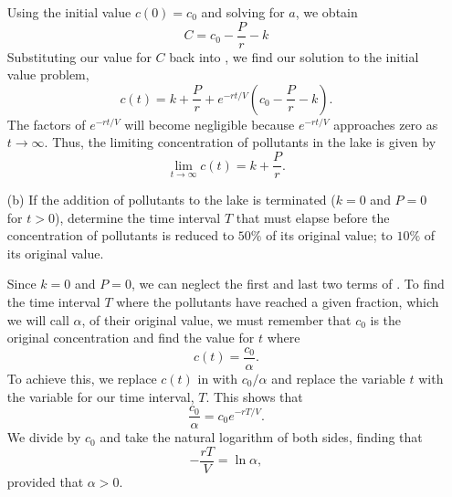 \begin{ex}
\begin{enumerate}
\begin{sol}
          Using the initial value $c(0)=c_0$ and solving for $a$, we obtain
          \begin{equation}
            C=c_0 -\frac{P}{r}-k
            \label{csol}
          \end{equation}
          Substituting our value for $C$ back into , we find our solution to the initial value problem,
          \begin{equation}
            c(t)=k+\frac{P}{r}+e^{-rt/V}\left( c_0 - \frac{P}{r} -k\right).
            \label{ctbig}
          \end{equation}
          The factors of $e^{-rt/V}$
          will become negligible because $e^{-rt/V}$ approaches zero as $t\to\infty$.
          Thus, the limiting concentration of pollutants in the lake is given by
          \begin{equation}
            \lim_{t\to\infty} c(t) = k+\frac{P}{r}.
            \label{limc}
          \end{equation}
       \end{sol}
      \item[(b)]
        If the addition of pollutants to the lake is terminated ($k=0$ and $P=0$ for $t>0$),
        determine the time interval $T$ that must elapse before the concentration of pollutants is reduced to $50\%$ of its original value;
        to $10\%$ of its original value.

        \begin{sol}
          Since $k=0$ and $P=0$, we can neglect the first and last two terms of .
          To find the time interval $T$ where the pollutants have reached a given fraction, which we will call $\alpha$, of their original value,
          we must remember that $c_0$ is the original concentration and find the value for $t$ where
          \begin{equation}
            c(t) = \frac{c_0}{\alpha}.
            \label{halfc}
          \end{equation}
          To achieve this, we replace $c(t)$ in  with $c_0/\alpha$ and replace the variable $t$ with the variable for our time interval, $T$.
          This shows that
          \begin{equation}
            \frac{c_0}{\alpha}=c_0 e^{-rT/V}.
            \label{halfceq}
          \end{equation}
          We divide by $c_0$ and take the natural logarithm of both sides, finding that
          \begin{equation}
            -\frac{rT}{V}=\ln{\alpha},
            \label{Tnlog}
          \end{equation}
          provided that $\alpha > 0$.


\end{sol}
\end{enumerate}
\end{ex}
